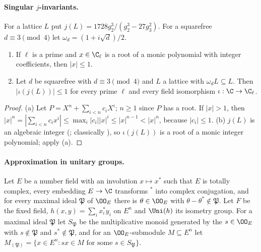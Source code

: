 \paragraph{Singular $j$-invariants.}
For a lattice $L$ put $j(L)=1728g_2^3/(g_2^3-27g_3^2)$. For a squarefree $d\equiv3\pmod4$ let $\omega_d=(1+i\sqrt d)/2$.

\begin{lemma}\label{pf:rows:jint}
\begin{enumerate}[label=(\alph*)]
\item If $\ell$ is a prime and $x\in\C_\ell$ is a root of a monic polynomial with integer coefficients, then $|x|\le1$.
\item Let $d$ be squarefree with $d\equiv3\pmod 4$ and $L$ a lattice with $\omega_dL\subseteq L$. Then $|\iota(j(L))|\le1$ for
every prime $\ell$ and every field isomorphism $\iota:\C\to\C_\ell$.
\end{enumerate}
\end{lemma}

\begin{proof}
(a) Let $P=X^n+\sum_{i<n}c_iX^i$; $n\ge1$ since $P$ has a root. If $|x|>1$, then
$|x|^n=|\sum_{i<n}c_ix^i|\le\max_i|c_i||x|^i\le|x|^{n-1}<|x|^n$, because $|c_i|\le1$.
(b) $j(L)$ is an algebraic integer (; classically
\cite[Ch.~II, Thm.~6.1]{Silverman1994}), so $\iota(j(L))$ is a root of a monic integer polynomial; apply (a).
\end{proof}

\paragraph{Approximation in unitary groups.}
Let $E$ be a number field with an involution $x\mapsto x^*$ such that $E$ is totally complex, every embedding $E\to\C$
transforms ${}^*$ into complex conjugation, and for every maximal ideal $\mathfrak P$ of $\OO_E$ there is $\theta\in\OO_E$ with
$\theta-\theta^*\notin\mathfrak P$. Let $F$ be the fixed field, $h(x,y)=\sum_ix_i^*y_i$ on $E^n$ and $\Uni(h)$ its isometry
group. For a maximal ideal $\mathfrak P$ let $S_{\mathfrak P}$ be the multiplicative monoid generated by the
$s\in\OO_E$ with $s\notin\mathfrak P$ and $s^*\notin\mathfrak P$, and for an $\OO_E$-submodule $M\subseteq E^n$ let
$M_{(\mathfrak P)}=\{x\in E^n:sx\in M\text{ for some }s\in S_{\mathfrak P}\}$.

